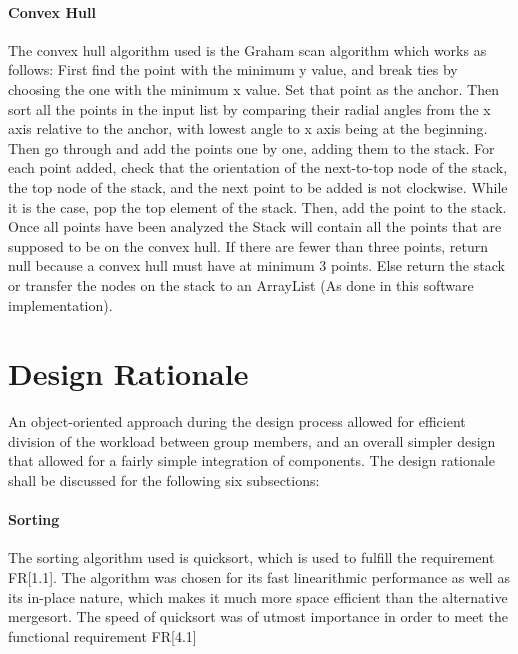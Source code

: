 \documentclass[12pt]{article}
\begin{document}
                \paragraph{Convex Hull} The convex hull algorithm used is the Graham scan algorithm which works as follows: First find the point with the minimum y value, and break ties by choosing the one with the minimum x value. Set that point as the anchor. Then sort all the points in the input list by comparing their radial angles from the x axis relative to the anchor, with lowest angle to x axis being at the beginning. Then go through and add the points one by one, adding them to the stack. For each point added, check that the orientation of the next-to-top node of the stack, the top node of the stack, and the next point to be added is not clockwise. While it is the case, pop the top element of the stack. Then, add the point to the stack. Once all points have been analyzed the Stack will contain all the points that are supposed to be on the convex hull. If there are fewer than three points, return null because a convex hull must have at minimum 3 points. Else return the stack or transfer the nodes on the stack to an ArrayList (As done in this software implementation).
                

\section{Design Rationale}
    An object-oriented approach during the design process allowed for efficient division of the workload between group members, and an overall simpler design that allowed for a fairly simple integration of components. The design rationale shall be discussed for the following six subsections:
    \paragraph{Sorting} The sorting algorithm used is quicksort, which is used to fulfill the requirement FR[1.1]. The algorithm was chosen for its fast linearithmic performance as well as its in-place nature, which makes it much more space efficient than the alternative mergesort. The speed of quicksort was of utmost importance in order to meet the functional requirement FR[4.1]
    
\end{document}
